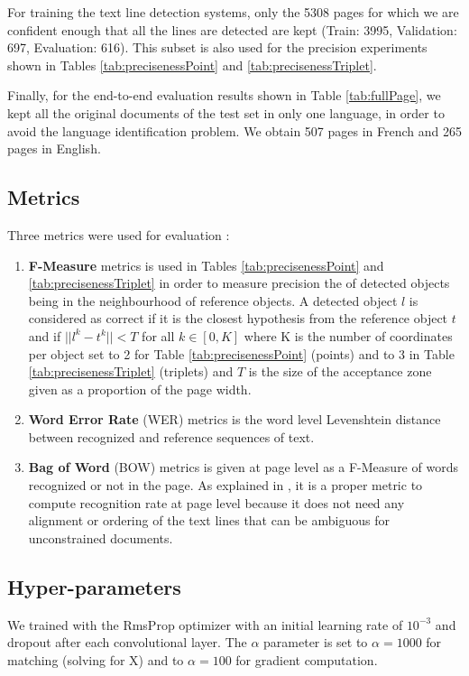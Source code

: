 \documentclass[conference]{IEEEtran}
\begin{document}
For training the text line detection systems, only the 5308 pages for which we are confident enough that all the lines are detected are kept (Train: 3995, Validation: 697, Evaluation: 616). This subset is also used for the precision experiments shown in Tables \ref{tab:precisenessPoint} and \ref{tab:precisenessTriplet}.

Finally, for the end-to-end evaluation results shown in Table \ref{tab:fullPage}, we kept all the original documents of the test set in only one language, in order to avoid the language identification problem. We obtain 507 pages in French and 265 pages in English.

\subsection{Metrics}
Three metrics were used for evaluation :

\begin{enumerate}
	\item \textbf{F-Measure} metrics is used in Tables \ref{tab:precisenessPoint} and \ref{tab:precisenessTriplet} in order to measure precision the  of detected objects being in the neighbourhood of reference objects. A detected object $l$ is considered as correct if it is the closest hypothesis from the reference object $t$ and if $||l^k - t^k|| < T$ for all $k \in [0,K]$ where K is the number of coordinates per object set to 2 for Table \ref{tab:precisenessPoint} (points) and to 3 in Table \ref{tab:precisenessTriplet} (triplets) and $T$ is the size of the acceptance zone given as a proportion of the page width.
	\item \textbf{Word Error Rate} (WER) metrics is the word level Levenshtein distance \cite{levenshtein1966binary} between recognized and reference sequences of text.
	\item \textbf{Bag of Word} (BOW) metrics is given at page level as a F-Measure of words recognized or not in the page. As explained in \cite{pletschacher2015europeana}, it is a proper metric to compute recognition rate at page level because it does not need any alignment or ordering of the text lines that can be ambiguous for unconstrained documents.

\end{enumerate}



\subsection{Hyper-parameters}
We trained with the RmsProp optimizer \cite{tieleman2012lecture} with an initial learning rate of $10^{-3}$ and dropout after each convolutional layer. The $\alpha$ parameter is set to $\alpha{=}1000$ for matching (solving for X) and to $\alpha{=}100$ for gradient computation.
\end{document}
